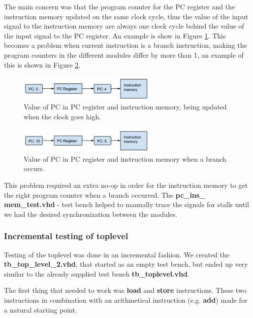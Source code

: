 The main concern was that the program counter for the PC register and the 
instruction memory updated on the same clock cycle, thus the value of the 
input signal to the
instruction memory are always one clock cycle behind the value of
the input signal to the PC register. An example is show in 
Figure \ref{pc-mem-sync1}. This becomes a problem when current instruction 
is a branch instruction, making the program counters in the different modules
differ by more than 1, an example of this is shown in 
Figure \ref{pc-mem-sync2}.

\begin{figure}[ht]
    \centering
        \includegraphics[width=0.6\textwidth]{figures/pc-mem-sync1}
    \caption{Value of PC in PC register and instruction memory, being
    updated when the clock goes high.}
    \label{pc-mem-sync1}
\end{figure}

\begin{figure}[ht]
    \centering
        \includegraphics[width=0.6\textwidth]{figures/pc-mem-sync2}
    \caption{Value of PC in PC register and instruction memory when a 
    branch occurs.}
    \label{pc-mem-sync2}
\end{figure}

This problem required an extra no-op in order for the 
instruction memory to get the right program counter when a branch
occurred. The \textbf{pc\_ins\_ mem\_test.vhd} - test bench helped to
manually trace the signals for stalls until we had the desired 
synchronization between the modules.

\subsubsection{Incremental testing of toplevel}
Testing of the toplevel was done in an incremental fashion.
We created the \textbf{tb\_top\_level\_2.vhd}, that started as 
an empty test bench, but ended up very similar to the already
supplied test bench \textbf{tb\_toplevel.vhd}.

The first thing that needed to work was \textbf{load} and 
\textbf{store} instructions. These two instructions in combination
with an arithmetical instruction (e.g. \textbf{add}) made for a natural
starting point.

